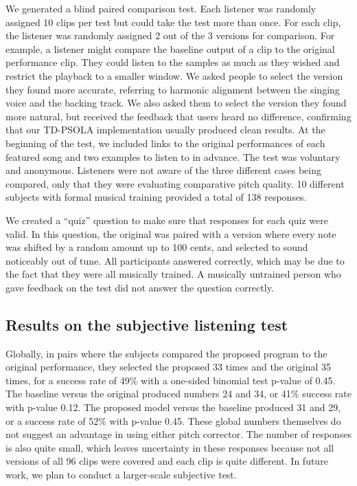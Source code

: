 We generated a blind paired comparison test. Each listener was randomly assigned 10 clips per test but could take the test more than once. For each clip, the listener was randomly assigned 2 out of the 3 versions for comparison. For example, a listener might compare the baseline output of a clip to the original performance clip. They could listen to the samples as much as they wished and restrict the playback to a smaller window. We asked people to select the version they found more accurate, referring to harmonic alignment between the singing voice and the backing track. We also asked them to select the version they found more natural, but received the feedback that users heard no difference, confirming that our TD-PSOLA implementation usually produced clean results. At the beginning of the test, we included links to the original performances of each featured song and two examples to listen to in advance. The test was voluntary and anonymous. Listeners were not aware of the three different cases being compared, only that they were evaluating comparative pitch quality. 10 different subjects with formal musical training provided a total of 138 responses. 

We created a ``quiz'' question to make sure that responses for each quiz were valid. In this question, the original was paired with a version where every note was shifted by a random amount up to 100 cents, and selected to sound noticeably out of tune. All participants answered correctly, which may be due to the fact that they were all musically trained. A musically untrained person who gave feedback on the test did not answer the question correctly.

\subsection{Results on the subjective listening test}
\label{sec:subjective-results}
Globally, in pairs where the subjects compared the proposed program to the original performance, they selected the proposed 33 times and the original 35 times, for a success rate of 49\% with a one-sided binomial test p-value of 0.45. The baseline versus the original produced numbers 24 and 34, or 41\% success rate with p-value 0.12. The proposed model versus the baseline produced 31 and 29, or a success rate of 52\% with p-value 0.45. These global numbers themselves do not suggest an advantage in using either pitch corrector. The number of responses is also quite small, which leaves uncertainty in these responses because not all versions of all 96 clips were covered and each clip is quite different. In future work, we plan to conduct a larger-scale subjective test.


